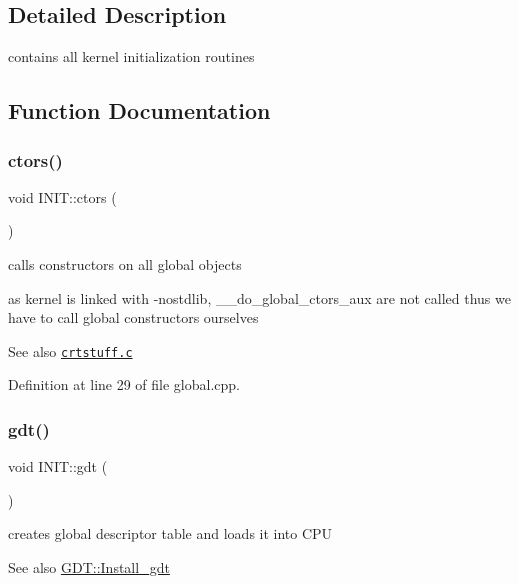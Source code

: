 \subsection{Detailed Description}
contains all kernel initialization routines 

\subsection{Function Documentation}
\mbox{\label{namespace_i_n_i_t_a6608557e41ad37cdb4a408e2f05c9783}} 
\subsubsection{\texorpdfstring{ctors()}{ctors()}}
{\footnotesize\ttfamily void I\+N\+I\+T\+::ctors (\begin{DoxyParamCaption}{ }\end{DoxyParamCaption})}



calls constructors on all global objects 

as kernel is linked with -\/nostdlib, \+\_\+\+\_\+do\+\_\+global\+\_\+ctors\+\_\+aux are not called thus we have to call global constructors ourselves

\begin{DoxySeeAlso}{See also}
\href{https://github.com/gcc-mirror/gcc/blob/master/libgcc/crtstuff.c}{\tt crtstuff.\+c} 
\end{DoxySeeAlso}


Definition at line 29 of file global.\+cpp.

\mbox{\label{namespace_i_n_i_t_a3462d7bc51bce77cc240d05b62b1b777}} 
\subsubsection{\texorpdfstring{gdt()}{gdt()}}
{\footnotesize\ttfamily void I\+N\+I\+T\+::gdt (\begin{DoxyParamCaption}{ }\end{DoxyParamCaption})}



creates global descriptor table and loads it into C\+PU 

\begin{DoxySeeAlso}{See also}
\hyperlink{namespace_g_d_t_a174feb7c5a037cc991bf4eb27c256366}{G\+D\+T\+::\+Install\+\_\+gdt} 
\end{DoxySeeAlso}


